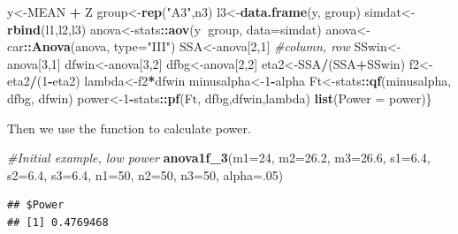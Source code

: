 \documentclass[]{article}
\newenvironment{Shaded}{\begin{snugshade}}{\end{snugshade}}
\newcommand{\KeywordTok}[1]{\textcolor[rgb]{0.13,0.29,0.53}{\textbf{#1}}}
\newcommand{\DataTypeTok}[1]{\textcolor[rgb]{0.13,0.29,0.53}{#1}}
\newcommand{\DecValTok}[1]{\textcolor[rgb]{0.00,0.00,0.81}{#1}}
\newcommand{\FloatTok}[1]{\textcolor[rgb]{0.00,0.00,0.81}{#1}}
\newcommand{\StringTok}[1]{\textcolor[rgb]{0.31,0.60,0.02}{#1}}
\newcommand{\CommentTok}[1]{\textcolor[rgb]{0.56,0.35,0.01}{\textit{#1}}}
\newcommand{\OperatorTok}[1]{\textcolor[rgb]{0.81,0.36,0.00}{\textbf{#1}}}
\newcommand{\NormalTok}[1]{#1}
\begin{document}
\begin{Shaded}
\begin{Highlighting}[]
\NormalTok{y<-MEAN }\OperatorTok{+}\StringTok{ }\NormalTok{Z}
\NormalTok{group<-}\KeywordTok{rep}\NormalTok{(}\StringTok{"A3"}\NormalTok{,n3)}
\NormalTok{l3<-}\KeywordTok{data.frame}\NormalTok{(y, group)}
\NormalTok{simdat<-}\KeywordTok{rbind}\NormalTok{(l1,l2,l3)}
\NormalTok{anova<-stats}\OperatorTok{::}\KeywordTok{aov}\NormalTok{(y}\OperatorTok{~}\NormalTok{group, }\DataTypeTok{data=}\NormalTok{simdat)}
\NormalTok{anova<-car}\OperatorTok{::}\KeywordTok{Anova}\NormalTok{(anova, }\DataTypeTok{type=}\StringTok{"III"}\NormalTok{)}
\NormalTok{SSA<-anova[}\DecValTok{2}\NormalTok{,}\DecValTok{1}\NormalTok{] }\CommentTok{#column, row}
\NormalTok{SSwin<-anova[}\DecValTok{3}\NormalTok{,}\DecValTok{1}\NormalTok{]}
\NormalTok{dfwin<-anova[}\DecValTok{3}\NormalTok{,}\DecValTok{2}\NormalTok{]}
\NormalTok{dfbg<-anova[}\DecValTok{2}\NormalTok{,}\DecValTok{2}\NormalTok{]}
\NormalTok{eta2<-SSA}\OperatorTok{/}\NormalTok{(SSA}\OperatorTok{+}\NormalTok{SSwin)}
\NormalTok{f2<-eta2}\OperatorTok{/}\NormalTok{(}\DecValTok{1}\OperatorTok{-}\NormalTok{eta2)}
\NormalTok{lambda<-f2}\OperatorTok{*}\NormalTok{dfwin}
\NormalTok{minusalpha<-}\DecValTok{1}\OperatorTok{-}\NormalTok{alpha}
\NormalTok{Ft<-stats}\OperatorTok{::}\KeywordTok{qf}\NormalTok{(minusalpha, dfbg, dfwin)}
\NormalTok{power<-}\DecValTok{1}\OperatorTok{-}\NormalTok{stats}\OperatorTok{::}\KeywordTok{pf}\NormalTok{(Ft, dfbg,dfwin,lambda)}
\KeywordTok{list}\NormalTok{(}\DataTypeTok{Power =}\NormalTok{ power)\}}
\end{Highlighting}
\end{Shaded}

Then we use the function to calculate power.

\begin{Shaded}
\begin{Highlighting}[]
\CommentTok{#Initial example, low power}
\KeywordTok{anova1f_3}\NormalTok{(}\DataTypeTok{m1=}\DecValTok{24}\NormalTok{, }\DataTypeTok{m2=}\FloatTok{26.2}\NormalTok{, }\DataTypeTok{m3=}\FloatTok{26.6}\NormalTok{, }\DataTypeTok{s1=}\FloatTok{6.4}\NormalTok{, }\DataTypeTok{s2=}\FloatTok{6.4}\NormalTok{, }\DataTypeTok{s3=}\FloatTok{6.4}\NormalTok{, }\DataTypeTok{n1=}\DecValTok{50}\NormalTok{, }\DataTypeTok{n2=}\DecValTok{50}\NormalTok{, }\DataTypeTok{n3=}\DecValTok{50}\NormalTok{, }\DataTypeTok{alpha=}\NormalTok{.}\DecValTok{05}\NormalTok{)}
\end{Highlighting}
\end{Shaded}

\begin{verbatim}
## $Power
## [1] 0.4769468
\end{verbatim}
\end{document}
